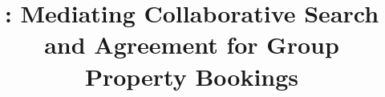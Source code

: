 \documentclass[manuscript,review,anonymous]{acmart}
\title{\tool: Mediating Collaborative Search and Agreement for Group Property Bookings}
\begin{document}
\begin{abstract}

\end{abstract}

\maketitle











\end{document}
